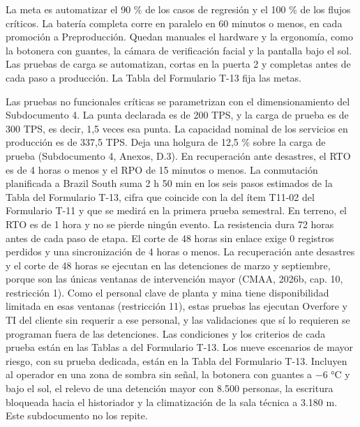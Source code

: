 \documentclass[subdoc]{../../comun/overfore}
\begin{document}
La meta es automatizar el 90 \% de los casos de regresión y el 100 \% de los flujos críticos. La batería completa corre en paralelo en 60 minutos o menos, en cada promoción a Preproducción. Quedan manuales el hardware y la ergonomía, como la botonera con guantes, la cámara de verificación facial y la pantalla bajo el sol. Las pruebas de carga se automatizan, cortas en la puerta 2 y completas antes de cada paso a producción. La Tabla  del Formulario T-13 fija las metas.

Las pruebas no funcionales críticas se parametrizan con el dimensionamiento del Subdocumento 4. La punta declarada es de 200 TPS, y la carga de prueba es de 300 TPS, es decir, 1,5 veces esa punta. La capacidad nominal de los servicios en producción es de 337,5 TPS. Deja una holgura de 12,5 \% sobre la carga de prueba (Subdocumento 4, Anexos, D.3). En recuperación ante desastres, el RTO es de 4 horas o menos y el RPO de 15 minutos o menos. La conmutación planificada a Brazil South suma 2 h 50 min en los seis pasos estimados de la Tabla  del Formulario T-13, cifra que coincide con la del ítem T11-02 del Formulario T-11 y que se medirá en la primera prueba semestral. En terreno, el RTO es de 1 hora y no se pierde ningún evento. La resistencia dura 72 horas antes de cada paso de etapa. El corte de 48 horas sin enlace exige 0 registros perdidos y una sincronización de 4 horas o menos. La recuperación ante desastres y el corte de 48 horas se ejecutan en las detenciones de marzo y septiembre, porque son las únicas ventanas de intervención mayor (CMAA, 2026b, cap. 10, restricción 1). Como el personal clave de planta y mina tiene disponibilidad limitada en esas ventanas (restricción 11), estas pruebas las ejecutan Overfore y TI del cliente sin requerir a ese personal, y las validaciones que sí lo requieren se programan fuera de las detenciones. Las condiciones y los criterios de cada prueba están en las Tablas  a  del Formulario T-13. Los nueve escenarios de mayor riesgo, con su prueba dedicada, están en la Tabla  del Formulario T-13. Incluyen al operador en una zona de sombra sin señal, la botonera con guantes a −6 °C y bajo el sol, el relevo de una detención mayor con 8.500 personas, la escritura bloqueada hacia el historiador y la climatización de la sala técnica a 3.180 m. Este subdocumento no los repite.
\end{document}
